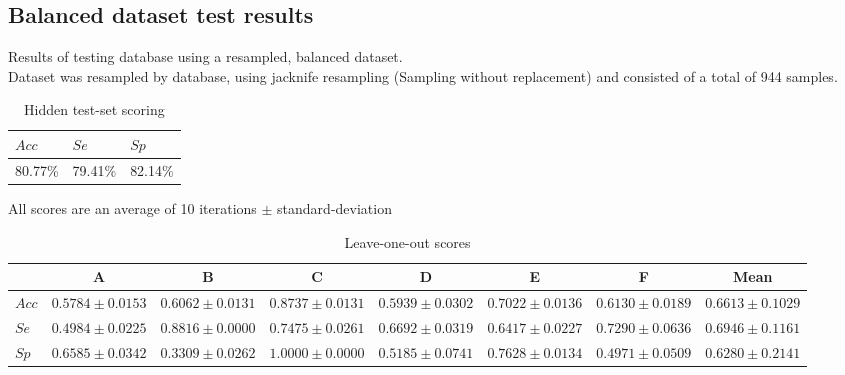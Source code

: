 \documentclass[titlepage, 12pt]{scrartcl} \usepackage{enumitem}
\begin{document}
\subsection{Balanced dataset test results}\label{appendixC}
Results of testing database using a resampled, balanced dataset.\\
Dataset was resampled by database, using jacknife resampling (Sampling without
replacement) and consisted of a total of 944 samples.
\begin{table}[H]
\centering
\caption{Hidden test-set scoring}
\begin{tabular}{@{}lll@{}}
\toprule
$Acc$  & $Se$    & $Sp$    \\ \midrule
80.77\% & 79.41\% & 82.14\% \\ \bottomrule
\end{tabular}
\end{table}

\begin{table}[H]
\doublespacing
\caption{Leave-one-out scores}
\footnotesize
All scores are an average of 10 iterations $\pm$ standard-deviation
\scriptsize
\centering
\begin{tabulary}{\linewidth}{LCCCCCCC}
\toprule
       & A                 & B                 & C                 & D                 & E                 & F                 & Mean              \\ \midrule
$Acc$ & $0.5784\pm0.0153$ & $0.6062\pm0.0131$ & $0.8737\pm0.0131$ & $0.5939\pm0.0302$ & $0.7022\pm0.0136$ & $0.6130\pm0.0189$ & $0.6613\pm0.1029$ \\
$Se$   & $0.4984\pm0.0225$ & $0.8816\pm0.0000$ & $0.7475\pm0.0261$ & $0.6692\pm0.0319$ & $0.6417\pm0.0227$ & $0.7290\pm0.0636$ & $0.6946\pm0.1161$ \\
$Sp$   & $0.6585\pm0.0342$ & $0.3309\pm0.0262$  & $1.0000\pm0.0000$ & $0.5185\pm0.0741$ & $0.7628\pm0.0134$ & $0.4971\pm0.0509$ & $0.6280\pm0.2141$ \\ \bottomrule
\end{tabulary}
\end{table}
\end{document}

